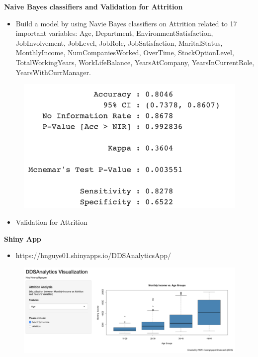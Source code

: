 \documentclass[notes,11pt]{beamer}
\begin{document}
\begin{frame}
\begin{center}
\textbf{\color{blue}\Large{Naive Bayes classifiers  and Validation for Attrition}}
\end{center}
\begin{itemize}
\item<1-> Build a model by using Navie Bayes classifiers  on Attrition related to 17 important variables: Age, Department, EnvironmentSatisfaction, JobInvolvement, JobLevel, JobRole, JobSatisfaction, MaritalStatus, MonthlyIncome, NumCompaniesWorked, OverTime, StockOptionLevel, TotalWorkingYears, WorkLifeBalance, YearsAtCompany, YearsInCurrentRole, YearsWithCurrManager.
\end{itemize}
\begin{figure}
\includegraphics[scale=0.3]{PIC11}
\end{figure}
\begin{itemize}
\item<1-> Validation for Attrition
\end{itemize}
\end{frame}



\begin{frame}
\begin{center}
\textbf{\color{blue}\Large{Shiny App}}
\end{center}
\begin{itemize}
\item<1-> https://hnguye01.shinyapps.io/DDSAnalyticsApp/
\end{itemize}
\begin{figure}
\includegraphics[scale=0.25]{PIC12}
\end{figure}
\end{frame}
\end{document}
